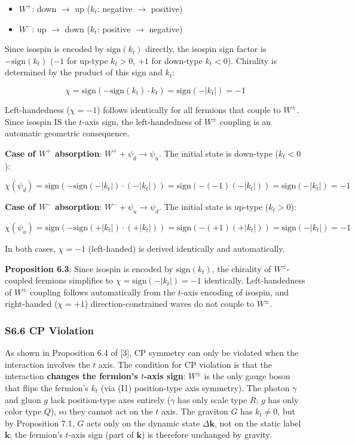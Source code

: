 \documentclass[
  a4paper,11pt]{article}
\providecommand{\tightlist}{%
  \setlength{\itemsep}{0pt}\setlength{\parskip}{0pt}}
\theoremstyle{definition}
\theoremstyle{remark}
\begin{document}
\begin{itemize}
\tightlist
\item
  \(W^+\): down \(\to\) up (\(k_t\): negative \(\to\) positive)
\item
  \(W^-\): up \(\to\) down (\(k_t\): positive \(\to\) negative)
\end{itemize}

Since isospin is encoded by \(\mathrm{sign}(k_t)\) directly, the isospin
sign factor is \(-\mathrm{sign}(k_t)\) (\(-1\) for up-type \(k_t > 0\),
\(+1\) for down-type \(k_t < 0\)). Chirality is determined by the
product of this sign and \(k_t\):

\[\chi = \mathrm{sign}(-\mathrm{sign}(k_t) \cdot k_t) = \mathrm{sign}(-|k_t|) = -1\]

Left-handedness (\(\chi = -1\)) follows identically for all fermions
that couple to \(W^{\pm}\). Since isospin IS the \(t\)-axis sign, the
left-handedness of \(W^{\pm}\) coupling is an automatic geometric
consequence.

\textbf{Case of \(W^+\) absorption}: \(W^+ + \psi_d \to \psi_u\). The
initial state is down-type (\(k_t < 0\)):

\[\chi(\psi_d) = \mathrm{sign}(-\mathrm{sign}(-|k_t|) \cdot (-|k_t|)) = \mathrm{sign}(-(-1)(-|k_t|)) = \mathrm{sign}(-|k_t|) = -1\]

\textbf{Case of \(W^-\) absorption}: \(W^- + \psi_u \to \psi_d\). The
initial state is up-type (\(k_t > 0\)):

\[\chi(\psi_u) = \mathrm{sign}(-\mathrm{sign}(+|k_t|) \cdot (+|k_t|)) = \mathrm{sign}(-(+1)(+|k_t|)) = \mathrm{sign}(-|k_t|) = -1\]

In both cases, \(\chi = -1\) (left-handed) is derived identically and
automatically.

\textbf{Proposition 6.3}: Since isospin is encoded by
\(\mathrm{sign}(k_t)\), the chirality of \(W^{\pm}\)-coupled fermions
simplifies to \(\chi = \mathrm{sign}(-|k_t|) = -1\) identically.
Left-handedness of \(W^{\pm}\) coupling follows automatically from the
\(t\)-axis encoding of isospin, and right-handed (\(\chi = +1\))
direction-constrained waves do not couple to \(W^{\pm}\).

\subsubsection{S6.6 CP Violation}\label{s6.6-cp-violation}

As shown in Proposition 6.4 of {[}3{]}, CP symmetry can only be violated
when the interaction involves the \(t\) axis. The condition for CP
violation is that the interaction \textbf{changes the fermion's
\(t\)-axis sign}: \(W^{\pm}\) is the only gauge boson that flips the
fermion's \(k_t\) (via (I1) position-type axis symmetry). The photon
\(\gamma\) and gluon \(g\) lack position-type axes entirely (\(\gamma\)
has only scale type \(R\); \(g\) has only color type \(Q\)), so they
cannot act on the \(t\) axis. The graviton \(G\) has \(k_t \neq 0\), but
by Proposition 7.1, \(G\) acts only on the dynamic state
\(\Delta\mathbf{k}\), not on the static label \(\mathbf{k}\); the
fermion's \(t\)-axis sign (part of \(\mathbf{k}\)) is therefore
unchanged by gravity.
\end{document}
